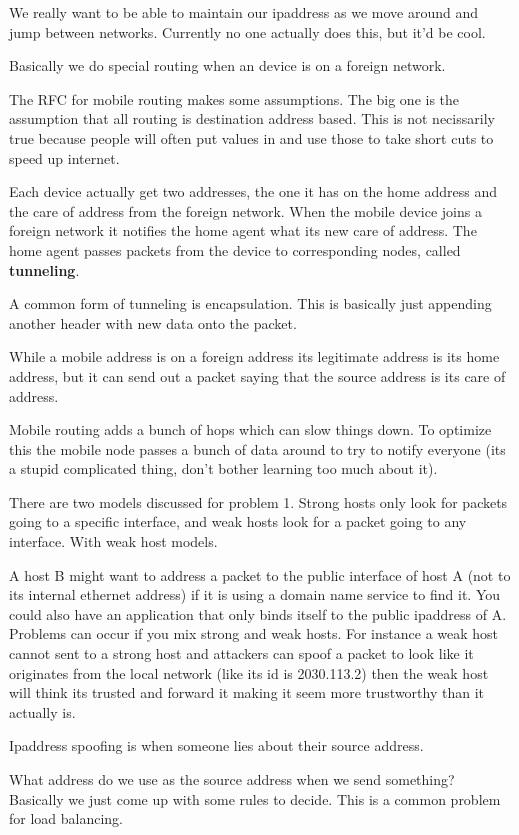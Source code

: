 \documentclass[12pt]{article}
\begin{document}

We really want to be able to maintain our ipaddress as we move around and jump between networks. Currently no one actually does this, but it'd be cool.


Basically we do special routing when an device is on a foreign network.


The RFC for mobile routing makes some assumptions. The big one is the assumption that all routing is destination address based. This is not necissarily true because people will often put values in and use those to take short cuts to speed up internet.




Each device actually get two addresses, the one it has on the home address and the care of address from the foreign network. When the mobile device joins a foreign network it notifies the home agent what its new care of address. The home agent passes packets from the device to corresponding nodes, called \textbf{tunneling}.


A common form of tunneling is encapsulation. This is basically just appending another header with new data onto the packet.


While a mobile address is on a foreign address its legitimate address is its home address, but it can send out a packet saying that the source address is its care of address.


Mobile routing adds a bunch of hops which can slow things down. To optimize this the mobile node passes a bunch of data around to try to notify everyone (its a stupid complicated thing, don't bother learning too much about it).




There are two models discussed for problem 1. Strong hosts only look for packets going to a specific interface, and weak hosts look for a packet going to any interface. With weak host models. 


A host B might want to address a packet to the public interface of host A (not to its internal ethernet address) if it is using a domain name service to find it. You could also have an application that only binds itself to the public ipaddress of A. Problems can occur if you mix strong and weak hosts. For instance a weak host cannot sent to a strong host and attackers can spoof a packet to look like it originates from the local network (like its id is 2030.113.2) then the weak host will think its trusted and forward it making it seem more trustworthy than it actually is.

Ipaddress spoofing is when someone lies about their source address. 




What address do we use as the source address when we send something? Basically we just come up with some rules to decide. This is a common problem for load balancing.
\end{document}
